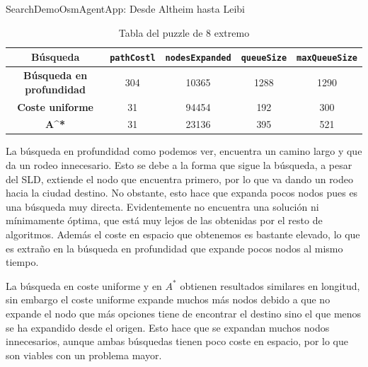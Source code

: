 \documentclass[11pt, a4paper, spanish, openright, twoside]{book}
\begin{document}
\begin{section}{SearchDemoOsmAgentApp: Desde Altheim hasta Leibi}

	\begin{table}	
		\begin{center}
			\begin{tabular}{|c||c|c|c|c|}		
				\hline	Búsqueda					& \texttt{pathCostl} 	& \texttt{nodesExpanded}	& \texttt{queueSize} 	& \texttt{maxQueueSize}\\ \hline \hline
				\textbf{Búsqueda en profundidad} 		& 	304			& 	10365				& 	1288			& 1290	  \\ \hline 
				\textbf{Coste uniforme}  				&  	31			& 	94454	 			& 	192			& 300	 \\ \hline 	
				\textbf{A^*}  					&  	31			& 	23136	 			& 	395			& 521	 \\ \hline 	
			\end{tabular}
		\caption{Tabla del puzzle de 8 extremo}
		\end{center}
	\end{table}
	La búsqueda en profundidad como podemos ver, encuentra un camino largo  y que da un rodeo innecesario. Esto se debe a la forma que sigue la búsqueda, a pesar del SLD, extiende el nodo que encuentra primero, por lo que va dando un rodeo hacia la ciudad destino. No obstante, esto hace que expanda pocos nodos pues es una búsqueda muy directa. Evidentemente no encuentra una solución ni mínimamente óptima, que está muy lejos de las obtenidas por el resto de algoritmos. Además el coste en espacio que obtenemos es bastante elevado, lo que es extraño en la búsqueda en profundidad que expande pocos nodos al mismo tiempo.
	
		La búsqueda en coste uniforme y en $A^*$ obtienen resultados similares en longitud, sin embargo el coste uniforme expande muchos más nodos debido a que no expande el nodo que más opciones tiene de encontrar el destino sino el que menos se ha expandido desde el origen. Esto hace que se expandan muchos nodos innecesarios, aunque ambas búsquedas tienen poco coste en espacio, por lo que son viables con un problema mayor.
\end{section}
\end{document}
